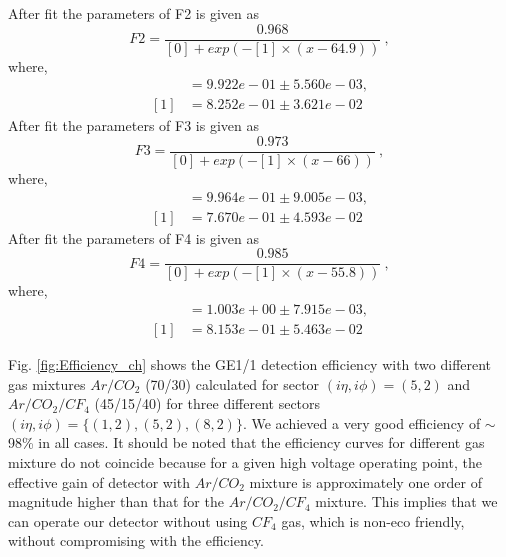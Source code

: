 After fit the parameters of F2 is given as
\begin{equation}
    F2 = \frac{0.968}{[0]+exp(-[1]\times(x-64.9))}~,
\end{equation}
where,
\begin{align*}
[0] &= 9.922e-01 \pm 5.560e-03,\\
[1] &= 8.252e-01 \pm 3.621e-02
\end{align*} 
After fit the parameters of F3 is given as
\begin{equation}
    F3 = \frac{0.973}{[0]+exp(-[1]\times(x-66))}~,
\end{equation}
where,
\begin{align*}
[0] &= 9.964e-01 \pm 9.005e-03, \\
[1] &= 7.670e-01 \pm 4.593e-02
\end{align*}
After fit the parameters of F4 is given as
\begin{equation}
    F4 = \frac{0.985}{[0]+exp(-[1]\times(x-55.8))}~,
\end{equation}
where,
\begin{align*}
[0] &= 1.003e+00 \pm 7.915e-03,\\
[1] &= 8.153e-01 \pm 5.463e-02
\end{align*}

Fig. \ref{fig:Efficiency_ch} shows the GE1/1 detection efficiency with two different gas mixtures $Ar/CO_2$ (70/30) calculated for sector $(i\eta,i\phi)=(5,2)$ and $Ar/CO_2/CF_4$ (45/15/40) for three different sectors $(i\eta,i\phi)=\{(1,2),(5,2),(8,2)\}$.
We achieved a very good efficiency of $\sim$ 98\% in all cases.
It should be noted that the efficiency curves for different gas mixture do not coincide because for a given high voltage operating point, the effective gain of detector with $Ar/CO_2$  mixture is approximately one order of magnitude higher than that for the $Ar/CO_2/CF_4$ mixture.
This implies that we can operate our detector without using $CF_4$ gas, which is non-eco friendly, without compromising with the efficiency.
      

